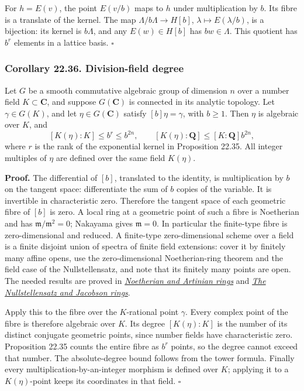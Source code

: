 \documentclass[
  11pt,
  a4paper,
]{article}
\begin{document}
For \(h=E(v)\), the point \(E(v/b)\) maps to \(h\) under multiplication
by \(b\). Its fibre is a translate of the kernel. The map
\(\Lambda/b\Lambda\to H[b]\), \(\lambda\mapsto E(\lambda/b)\), is a
bijection: its kernel is \(b\Lambda\), and any \(E(w)\in H[b]\) has
\(bw\in\Lambda\). This quotient has \(b^r\) elements in a lattice basis.
\(\square\)

\subsubsection{Corollary 22.36. Division-field
degree}\label{corollary-22.36.-division-field-degree}

Let \(G\) be a smooth commutative algebraic group of dimension \(n\)
over a number field \(K\subset\mathbf C\), and suppose \(G(\mathbf C)\)
is connected in its analytic topology. Let \(\gamma\in G(K)\), and let
\(\eta\in G(\mathbf C)\) satisfy \([b]\eta=\gamma\), with \(b\ge1\).
Then \(\eta\) is algebraic over \(K\), and \[
 [K(\eta):K]\le b^r\le b^{2n},
 \qquad
 [K(\eta):\mathbf Q]\le[K:\mathbf Q]b^{2n},
 \tag{22.93}
\] where \(r\) is the rank of the exponential kernel in Proposition
22.35. All integer multiples of \(\eta\) are defined over the same field
\(K(\eta)\).

\textbf{Proof.} The differential of \([b]\), translated to the identity,
is multiplication by \(b\) on the tangent space: differentiate the sum
of \(b\) copies of the variable. It is invertible in characteristic
zero. Therefore the tangent space of each geometric fibre of \([b]\) is
zero. A local ring at a geometric point of such a fibre is Noetherian
and has \(\mathfrak m/\mathfrak m^2=0\); Nakayama gives
\(\mathfrak m=0\). In particular the finite-type fibre is
zero-dimensional and reduced. A finite-type zero-dimensional scheme over
a field is a finite disjoint union of spectra of finite field
extensions: cover it by finitely many affine opens, use the
zero-dimensional Noetherian-ring theorem and the field case of the
Nullstellensatz, and note that its finitely many points are open. The
needed results are proved in
\href{https://kokunoyumeto.github.io/open-math-courses-public/courses/AG-CA/AG-CA-03.html}{\emph{Noetherian and Artinian rings}}
and \href{https://kokunoyumeto.github.io/open-math-courses-public/courses/AG-CA/AG-CA-06.html}{\emph{The Nullstellensatz and
Jacobson rings}}.

Apply this to the fibre over the \(K\)-rational point \(\gamma\). Every
complex point of the fibre is therefore algebraic over \(K\). Its degree
\([K(\eta):K]\) is the number of its distinct conjugate geometric
points, since number fields have characteristic zero. Proposition 22.35
counts the entire fibre as \(b^r\) points, so the degree cannot exceed
that number. The absolute-degree bound follows from the tower formula.
Finally every multiplication-by-an-integer morphism is defined over
\(K\); applying it to a \(K(\eta)\)-point keeps its coordinates in that
field. \(\square\)
\end{document}
